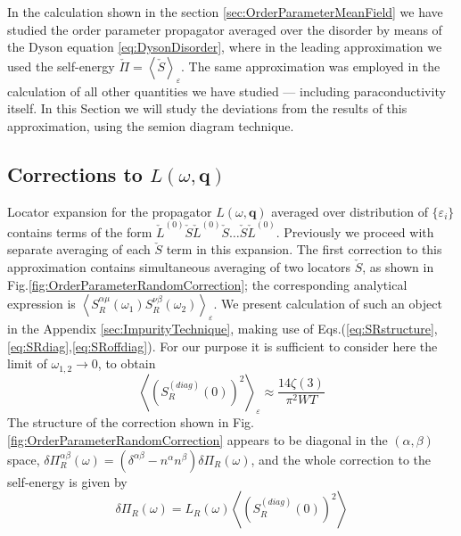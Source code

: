 \documentclass[twocolumn,english,prb]{revtex4-1}
\begin{document}
In the calculation shown in the section \ref{sec:OrderParameterMeanField} we have studied the order parameter propagator averaged over the disorder by means of the Dyson equation \eqref{eq:DysonDisorder}, where in the leading approximation we used  the self-energy 
$\check{\Pi} = \left\langle \check{S} \right\rangle_{\varepsilon}$. The  same approximation was employed in the calculation of 
all other quantities we have studied --- including paraconductivity itself. In this Section we will study the deviations from
the results of this approximation, using  the semion  diagram technique.

\subsection{Corrections to  $L(\omega,\boldsymbol{q})$}


Locator expansion for the propagator $L(\omega,\boldsymbol{q})$ averaged over distribution of $\{\varepsilon_i\}$ contains
terms of the form $\check{L}^{(0)}\check{S}\check{L}^{(0)}\check{S}\dots\check{S}\check{L}^{(0)}$. 
Previously we proceed with separate averaging of each $ \check{S} $ term in this expansion.  The first correction
to this approximation contains simultaneous averaging of two locators $ \check{S} $, as shown in 
Fig.\ref{fig:OrderParameterRandomCorrection}; the corresponding analytical expression is 
$\left\langle S^{\alpha \mu}_{R}(\omega_1) S_{R}^{\nu \beta}(\omega_2)\right\rangle_\varepsilon$.  
We present calculation of such an object in the Appendix \ref{sec:ImpurityTechnique}, making use of 
Eqs.(\ref{eq:SRstructure},\ref{eq:SRdiag},\ref{eq:SRoffdiag}).  For our  purpose it is sufficient
to consider here the limit of $\omega_{1,2} \to 0$, to obtain
\begin{equation}
\left\langle (S_{R}^{(diag)}(0))^2\right\rangle_\varepsilon \approx \frac{14 \zeta(3)}{\pi^2 WT}
\label{2S}
\end{equation}
The structure of the correction shown in Fig. \ref{fig:OrderParameterRandomCorrection} appears to be diagonal
in the $(\alpha,\beta)$ space,
$\delta \Pi_R^{\alpha \beta}(\omega) = (\delta^{\alpha \beta} - n^\alpha n^\beta) \delta \Pi_R(\omega)$,
 and the whole correction to the self-energy is given by
\begin{equation}
\delta\Pi_{R}(\omega) = 
L_{R}(\omega)\left\langle (S_{R}^{(diag)}(0))^{2}\right\rangle
\label{deltaPi}
\end{equation}
\end{document}

